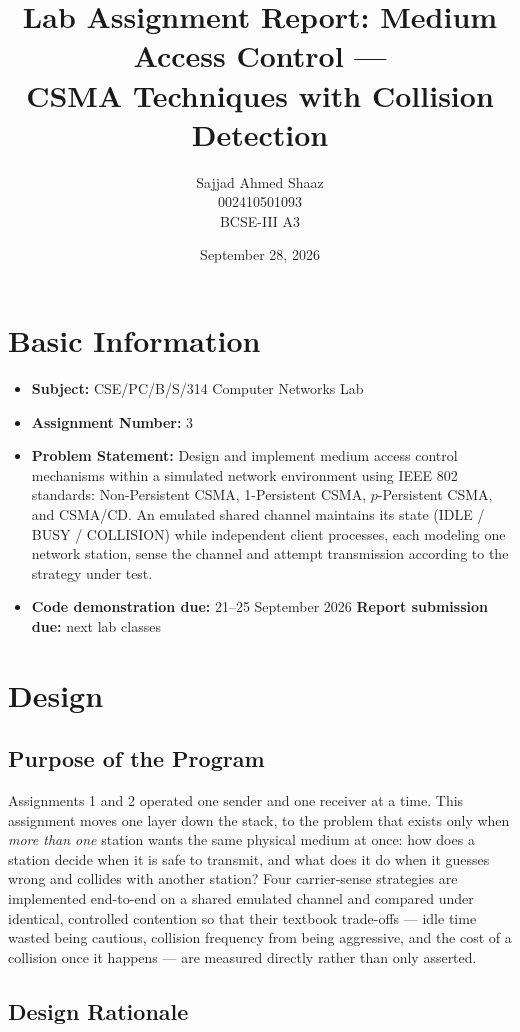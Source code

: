\documentclass[11pt]{article}
\title{\Large\textbf{Lab Assignment Report: Medium Access Control ---\\ CSMA Techniques with Collision Detection}}
\author{Sajjad Ahmed Shaaz \\ 002410501093 \\ BCSE-III A3}
\date{September 28, 2026}
\begin{document}
\maketitle

\section*{Basic Information}
\begin{itemize}[leftmargin=1.6em]
  \item \textbf{Subject:} CSE/PC/B/S/314 Computer Networks Lab
  \item \textbf{Assignment Number:} 3
  \item \textbf{Problem Statement:} Design and implement medium access control mechanisms
  within a simulated network environment using IEEE 802 standards: Non-Persistent CSMA,
  1-Persistent CSMA, $p$-Persistent CSMA, and CSMA/CD. An emulated shared channel maintains
  its state (IDLE / BUSY / COLLISION) while independent client processes, each modeling one
  network station, sense the channel and attempt transmission according to the strategy
  under test.
  \item \textbf{Code demonstration due:} 21--25 September 2026 \quad
  \textbf{Report submission due:} next lab classes
\end{itemize}

\section{Design}

\subsection{Purpose of the Program}
Assignments 1 and 2 operated one sender and one receiver at a time. This assignment moves
one layer down the stack, to the problem that exists only when \emph{more than one} station
wants the same physical medium at once: how does a station decide when it is safe to
transmit, and what does it do when it guesses wrong and collides with another station? Four
carrier-sense strategies are implemented end-to-end on a shared emulated channel and
compared under identical, controlled contention so that their textbook trade-offs --- idle
time wasted being cautious, collision frequency from being aggressive, and the cost of a
collision once it happens --- are measured directly rather than only asserted.

\subsection{Design Rationale}
\end{document}
